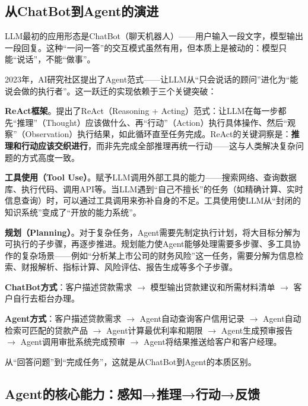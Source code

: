 \subsection{从ChatBot到Agent的演进}

LLM最初的应用形态是ChatBot（聊天机器人）——用户输入一段文字，模型输出一段回复。这种``一问一答''的交互模式虽然有用，但本质上是被动的：模型只能``说话''，不能``做事''。

2023年，AI研究社区提出了Agent范式——让LLM从``只会说话的顾问''进化为``能说会做的执行者''。这一跃迁的实现依赖于三个关键突破：

\textbf{ReAct框架}。\textcite{yao2023react}提出了ReAct（Reasoning + Acting）范式：让LLM在每一步都先``推理''（Thought）应该做什么、再``行动''（Action）执行具体操作、然后``观察''（Observation）执行结果，如此循环直至任务完成。ReAct的关键洞察是：\textbf{推理和行动应该交织进行}，而非先完成全部推理再统一行动——这与人类解决复杂问题的方式高度一致。

\textbf{工具使用（Tool Use）}。赋予LLM调用外部工具的能力——搜索网络、查询数据库、执行代码、调用API等。当LLM遇到``自己不擅长''的任务（如精确计算、实时信息查询）时，可以通过工具调用来弥补自身的不足。工具使用使LLM从``封闭的知识系统''变成了``开放的能力系统''。

\textbf{规划（Planning）}。对于复杂任务，Agent需要先制定执行计划，将大目标分解为可执行的子步骤，再逐步推进。规划能力使Agent能够处理需要多步骤、多工具协作的复杂场景——例如``分析某上市公司的财务风险''这一任务，需要分解为信息检索、财报解析、指标计算、风险评估、报告生成等多个子步骤。

\begin{casebox}
\textbf{ChatBot方式}：客户描述贷款需求 $\rightarrow$ 模型输出贷款建议和所需材料清单 $\rightarrow$ 客户自行去柜台办理。

\textbf{Agent方式}：客户描述贷款需求 $\rightarrow$ Agent自动查询客户信用记录 $\rightarrow$ Agent自动检索可匹配的贷款产品 $\rightarrow$ Agent计算最优利率和期限 $\rightarrow$ Agent生成预审报告 $\rightarrow$ Agent调用审批系统完成预审 $\rightarrow$ Agent将结果推送给客户和客户经理。

从``回答问题''到``完成任务''，这就是从ChatBot到Agent的本质区别。
\end{casebox}

\subsection{Agent的核心能力：感知→推理→行动→反馈}

